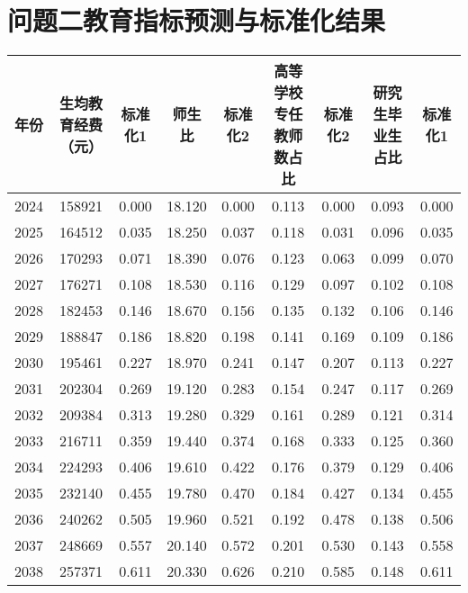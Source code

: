 \documentclass[withoutpreface,bwprint]{cumcmthesis} %
\begin{document}
\section{问题二教育指标预测与标准化结果}
\label{sec:问题二教育指标预测与标准化结果}
\begin{table}[H]
    \fontsize{7}{10}\selectfont
    \centering
    \begin{tabular}{|c|c|c|c|c|c|c|c|c|}
    \hline
    年份   & 生均教育经费（元） & 标准化1  & 师生比    & 标准化2  & 高等学校专任教师数占比 & 标准化2  & 研究生毕业生占比 & 标准化1  \\ \hline
    2024 & 158921    & 0.000 & 18.120 & 0.000 & 0.113       & 0.000 & 0.093    & 0.000 \\ \hline
    2025 & 164512    & 0.035 & 18.250 & 0.037 & 0.118       & 0.031 & 0.096    & 0.035 \\ \hline
    2026 & 170293    & 0.071 & 18.390 & 0.076 & 0.123       & 0.063 & 0.099    & 0.070 \\ \hline
    2027 & 176271    & 0.108 & 18.530 & 0.116 & 0.129       & 0.097 & 0.102    & 0.108 \\ \hline
    2028 & 182453    & 0.146 & 18.670 & 0.156 & 0.135       & 0.132 & 0.106    & 0.146 \\ \hline
    2029 & 188847    & 0.186 & 18.820 & 0.198 & 0.141       & 0.169 & 0.109    & 0.186 \\ \hline
    2030 & 195461    & 0.227 & 18.970 & 0.241 & 0.147       & 0.207 & 0.113    & 0.227 \\ \hline
    2031 & 202304    & 0.269 & 19.120 & 0.283 & 0.154       & 0.247 & 0.117    & 0.269 \\ \hline
    2032 & 209384    & 0.313 & 19.280 & 0.329 & 0.161       & 0.289 & 0.121    & 0.314 \\ \hline
    2033 & 216711    & 0.359 & 19.440 & 0.374 & 0.168       & 0.333 & 0.125    & 0.360 \\ \hline
    2034 & 224293    & 0.406 & 19.610 & 0.422 & 0.176       & 0.379 & 0.129    & 0.406 \\ \hline
    2035 & 232140    & 0.455 & 19.780 & 0.470 & 0.184       & 0.427 & 0.134    & 0.455 \\ \hline
    2036 & 240262    & 0.505 & 19.960 & 0.521 & 0.192       & 0.478 & 0.138    & 0.506 \\ \hline
    2037 & 248669    & 0.557 & 20.140 & 0.572 & 0.201       & 0.530 & 0.143    & 0.558 \\ \hline
    2038 & 257371    & 0.611 & 20.330 & 0.626 & 0.210       & 0.585 & 0.148    & 0.611 \\ \hline

\end{tabular}
\end{table}
\end{document}
